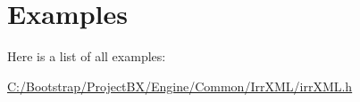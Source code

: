 \section{Examples}
Here is a list of all examples:\begin{CompactItemize}
\item 
\hyperlink{_c_1_2_bootstrap_2_project_b_x_2_engine_2_common_2_irr_x_m_l_2irr_x_m_l_8h-example}{C:/Bootstrap/ProjectBX/Engine/Common/IrrXML/irrXML.h}
\end{CompactItemize}
